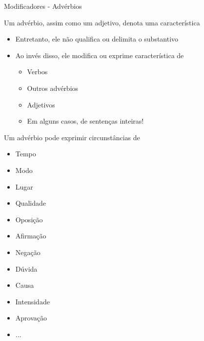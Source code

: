 \documentclass[compress,mathserif,xcolor=table]{beamer}
\begin{document}
\begin{frame}{Modificadores - Advérbios}

Um advérbio, assim como um adjetivo, denota uma característica
\begin{itemize}
    \item Entretanto, ele não qualifica ou delimita o substantivo
    \item Ao invés disso, ele modifica ou exprime característica de
    \begin{itemize}
        \item Verbos
        \item Outros advérbios
        \item Adjetivos
        \item Em alguns casos, de sentenças inteiras!
    \end{itemize}
\end{itemize}

\vspace{0.5cm}

Um advérbio pode exprimir circunstâncias de

\begin{minipage}{.32\textwidth}
\begin{itemize}
    \item Tempo
    \item Modo
    \item Lugar
    \item Qualidade
\end{itemize}
\end{minipage}
\begin{minipage}{.33\textwidth}
\begin{itemize}
    \item Oposição
    \item Afirmação
    \item Negação
    \item Dúvida
\end{itemize}
\end{minipage}
\begin{minipage}{.32\textwidth}
\begin{itemize}
    \item Causa
    \item Intensidade
    \item Aprovação
    \item $\ldots$
\end{itemize}
\end{minipage}

\end{frame}
\end{document}
